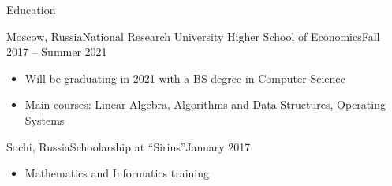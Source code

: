 \documentclass[]{mcdowellcv}
\begin{document}
	\makeheader



	\begin{cvsection}{Education}
		\begin{cvsubsection}{Moscow, Russia}{National Research University Higher School of Economics}{Fall 2017 -- Summer 2021}

                    \vskip 0.3cm

			\begin{itemize}
                            \item Will be graduating in 2021 with a BS degree in Computer Science
                            \item Main courses: Linear Algebra, Algorithms and Data Structures, Operating Systems
			\end{itemize}
		\end{cvsubsection}

                \begin{cvsubsection}{Sochi, Russia}{Schoolarship at ``Sirius''}{January 2017}
                    \begin{itemize}
                        \item Mathematics and Informatics training
                    \end{itemize}
                \end{cvsubsection}

	\end{cvsection}
\end{document}
